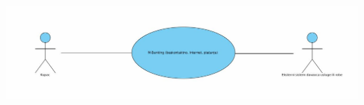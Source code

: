 \documentclass{article}
\begin{document}
\includegraphics[scale = 0.27]{./UseCases/Pictures/M-Banking.jpg}
\end{document}
